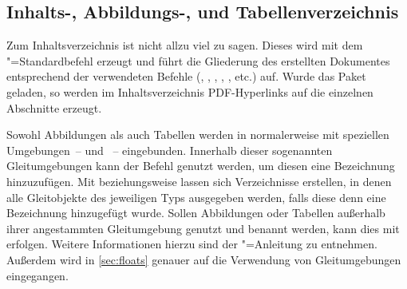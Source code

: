 \documentclass[%
  english,ngerman,%
  geometry=no,DIV=12,automark,%
]{tudscrartcl}
\begin{document}
\subsection{Inhalts-, Abbildungs-, und Tabellenverzeichnis}
Zum Inhaltsverzeichnis ist nicht allzu viel zu sagen. Dieses wird mit dem
"=Standardbefehl  erzeugt und führt die 
Gliederung des erstellten Dokumentes entsprechend der verwendeten Befehle 
(, , , , 
,  etc.) auf. Wurde das Paket  
geladen, so werden im Inhaltsverzeichnis PDF-Hyperlinks auf die einzelnen 
Abschnitte erzeugt.

Sowohl Abbildungen als auch Tabellen werden in  normalerweise mit 
speziellen Umgebungen~--  und ~-- 
eingebunden. Innerhalb dieser sogenannten Gleitumgebungen kann der Befehl 
 genutzt 
werden, um diesen eine Bezeichnung hinzuzufügen. Mit  
beziehungsweise  lassen sich Verzeichnisse erstellen, in 
denen alle Gleitobjekte des jeweiligen Typs ausgegeben werden, falls diese denn 
eine Bezeichnung hinzugefügt wurde. Sollen Abbildungen oder Tabellen außerhalb 
ihrer angestammten Gleitumgebung genutzt und benannt werden, kann dies mit
erfolgen. Weitere Informationen hierzu sind der \KOMAScript"=Anleitung 
\scrguide zu entnehmen. Außerdem wird in \autoref{sec:floats} genauer auf die 
Verwendung von Gleitumgebungen eingegangen.
%
\begin{Excerpt*}
\tableofcontents
\listoffigures
\listoftables
\clearpage
\end{Excerpt*}
\end{document}
